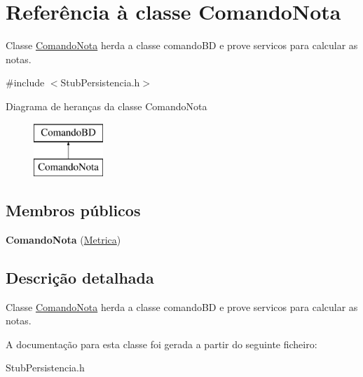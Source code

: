 \hypertarget{class_comando_nota}{
\section{\-Referência à classe \-Comando\-Nota}
\label{class_comando_nota}
}


\-Classe \hyperlink{class_comando_nota}{\-Comando\-Nota} herda a classe comando\-B\-D e prove servicos para calcular as notas.  




{\ttfamily \#include $<$\-Stub\-Persistencia.\-h$>$}

\-Diagrama de heranças da classe \-Comando\-Nota\begin{figure}[H]
\begin{center}
\leavevmode
\includegraphics[height=2.000000cm]{class_comando_nota}
\end{center}
\end{figure}
\subsection*{\-Membros públicos}
\begin{DoxyCompactItemize}
\item 
\hypertarget{class_comando_nota_a004db82bed69f7bd1d20b6f02e222a7b}{
{\bfseries \-Comando\-Nota} (\hyperlink{class_metrica}{\-Metrica})}
\label{class_comando_nota_a004db82bed69f7bd1d20b6f02e222a7b}

\end{DoxyCompactItemize}


\subsection{\-Descrição detalhada}
\-Classe \hyperlink{class_comando_nota}{\-Comando\-Nota} herda a classe comando\-B\-D e prove servicos para calcular as notas. 

\-A documentação para esta classe foi gerada a partir do seguinte ficheiro\-:\begin{DoxyCompactItemize}
\item 
\-Stub\-Persistencia.\-h\end{DoxyCompactItemize}
